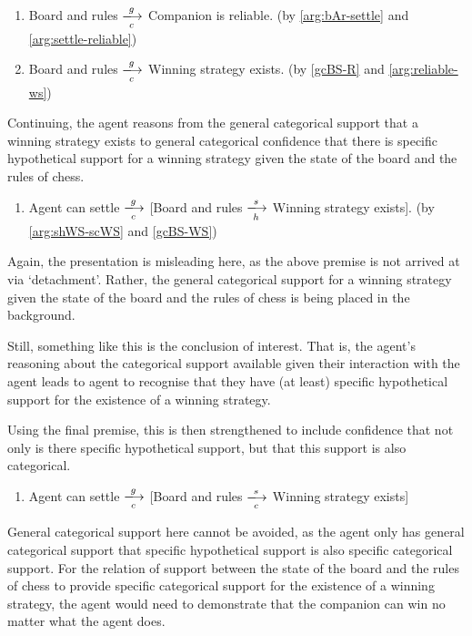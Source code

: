 \documentclass[10pt]{article}
\begin{document}
\begin{enumerate}[resume]
\item\label{gcBS-R} Board and rules \(\xlongrightarrow[c]{g}\) Companion is reliable. \hfill (by \ref{arg:bAr-settle} and \ref{arg:settle-reliable})
\item\label{gcBS-WS} Board and rules \(\xlongrightarrow[c]{g}\) Winning strategy exists. \hfill (by \ref{gcBS-R} and \ref{arg:reliable-ws})
\end{enumerate}

Continuing, the agent reasons from the general categorical support that a winning strategy exists to general categorical confidence that there is specific hypothetical support for a winning strategy given the state of the board and the rules of chess.

\begin{enumerate}[resume]
\item Agent can settle \(\xlongrightarrow[c]{g}\) [Board and rules \(\xlongrightarrow[h]{s}\) Winning strategy exists].\linebreak
  \mbox{}\hfill(by \ref{arg:shWS-scWS} and \ref{gcBS-WS})
\end{enumerate}

Again, the presentation is misleading here, as the above premise is not arrived at via `detachment'.
Rather, the general categorical support for a winning strategy given the state of the board and the rules of chess is being placed in the background.

Still, something like this is the conclusion of interest.
That is, the agent's reasoning about the categorical support available given their interaction with the agent leads to agent to recognise that they have (at least) specific hypothetical support for the existence of a winning strategy.

Using the final premise, this is then strengthened to include confidence that not only is there specific hypothetical support, but that this support is also categorical.

\begin{enumerate}[resume]
\item\label{p:?} Agent can settle \(\xlongrightarrow[c]{g}\) [Board and rules \(\xlongrightarrow[c]{s}\) Winning strategy exists]
\end{enumerate}

General categorical support here cannot be avoided, as the agent only has general categorical support that specific hypothetical support is also specific categorical support.
For the relation of support between the state of the board and the rules of chess to provide specific categorical support for the existence of a winning strategy, the agent would need to demonstrate that the companion can win no matter what the agent does.
\end{document}
